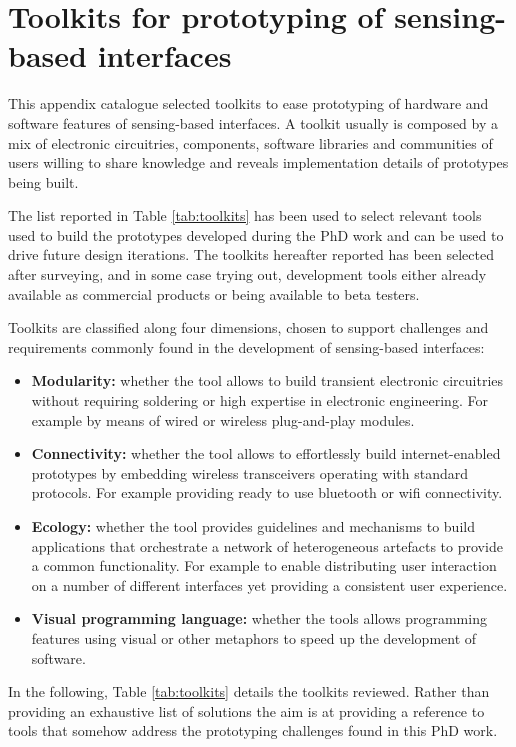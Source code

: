 \chapter{Toolkits for prototyping of sensing-based interfaces} \label{toolkits}

This appendix catalogue selected toolkits to ease prototyping of hardware and software features of sensing-based interfaces. A toolkit usually is composed by a mix of electronic circuitries, components, software libraries and communities of users willing to share knowledge and reveals implementation details of prototypes being built. 

The list reported in Table \ref{tab:toolkits} has been used to select relevant tools used to build the prototypes developed during the PhD work and can be used to drive future design iterations.  The toolkits hereafter reported has been selected after surveying, and in some case trying out, development tools either already available as commercial products or being available to beta testers. 

Toolkits are classified along four dimensions, chosen to support  challenges and requirements commonly found in the development of sensing-based interfaces:

\begin{itemize}
	\item \textbf{Modularity: }whether the tool allows to build transient electronic circuitries without requiring soldering or high expertise in electronic engineering. For example by means of wired or wireless plug-and-play modules. 
	\item \textbf{Connectivity: }whether the tool allows to effortlessly build internet-enabled prototypes by embedding wireless transceivers operating with standard protocols. For example providing ready to use bluetooth or wifi connectivity.
	\item \textbf{Ecology: }whether the tool provides guidelines and mechanisms to build applications that orchestrate a network of heterogeneous artefacts to provide a common functionality. For example to enable distributing user interaction on a number of different interfaces yet providing a consistent user experience.
	\item \textbf{Visual programming language: }whether the tools allows programming features using visual or other metaphors to speed up the development of software.
\end{itemize} 

In the following, Table \ref{tab:toolkits} details the toolkits reviewed. Rather than providing an exhaustive list of solutions the aim is at providing a reference to tools that somehow address the prototyping challenges found in this PhD work. 


